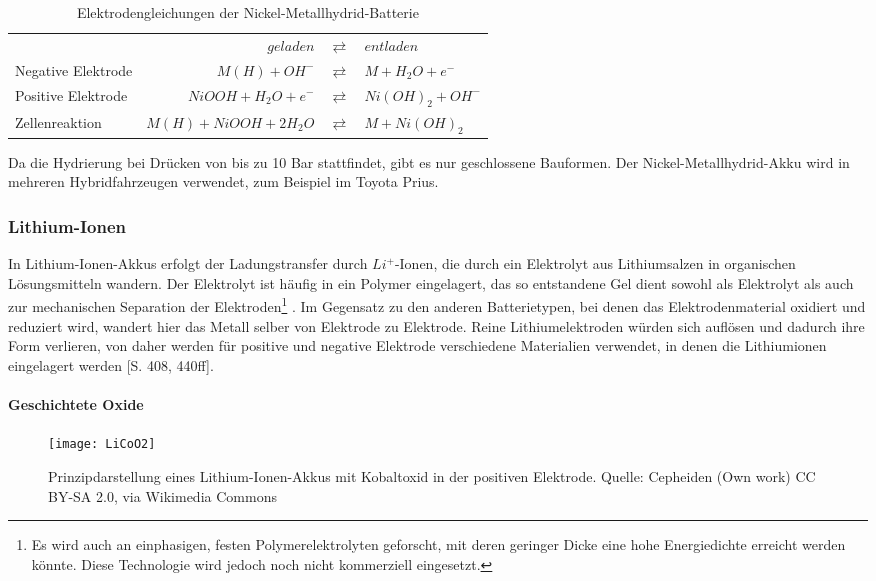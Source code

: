 \begin{table}\centering
	\begin{tabularx}{\linewidth}{XrcX}
		&              $geladen$ & $\rightleftarrows$ & $entladen$        \\
		Negative Elektrode &          $M(H) + OH^-$ & $\rightleftarrows$ & $M + H_2O + e^-$  \\
		Positive Elektrode &   $NiOOH + H_2O + e^-$ & $\rightleftarrows$ & $Ni(OH)_2 + OH^-$ \\ \midrule
		Zellenreaktion     & $M(H) + NiOOH + 2H_2O$ & $\rightleftarrows$ & $M + Ni(OH)_2$    \\
	\end{tabularx}
	\caption{Elektrodengleichungen der Nickel-Metallhydrid-Batterie}
	\label{NiMH}
\end{table}

Da die Hydrierung bei Drücken von bis zu 10 Bar stattfindet, gibt es nur geschlossene Bauformen. Der Nickel-Metallhydrid-Akku wird in mehreren Hybridfahrzeugen verwendet, zum Beispiel im Toyota Prius. 

\subsubsection{Lithium-Ionen}
In Lithium-Ionen-Akkus erfolgt der Ladungstransfer durch $Li^+$-Ionen, die durch ein Elektrolyt aus Lithiumsalzen in organischen Lösungsmitteln wandern. Der Elektrolyt ist häufig in ein Polymer eingelagert, das so entstandene Gel dient sowohl als Elektrolyt als auch zur mechanischen Separation der Elektroden\footnote{Es wird auch an einphasigen, festen Polymerelektrolyten geforscht, mit deren geringer Dicke eine hohe Energiedichte erreicht werden könnte. Diese Technologie wird jedoch noch nicht kommerziell eingesetzt.} \cite{xu2004nonaqueous}. Im Gegensatz zu den anderen Batterietypen, bei denen das Elektrodenmaterial oxidiert und reduziert wird, wandert hier das Metall selber von Elektrode zu Elektrode. Reine Lithiumelektroden würden sich auflösen und dadurch ihre Form verlieren, von daher werden für positive und negative Elektrode verschiedene Materialien verwendet, in denen die Lithiumionen eingelagert werden \cite{KiehneBattery}[S. 408, 440ff].

\paragraph{Geschichtete Oxide}

\begin{figure}\centering
	\texttt{[image: LiCoO2]}
	\caption{Prinzipdarstellung eines Lithium-Ionen-Akkus mit Kobaltoxid in der positiven Elektrode. Quelle: Cepheiden (Own work) CC BY-SA 2.0, via Wikimedia Commons}
	\label{abb_LiCoO2}
\end{figure}

